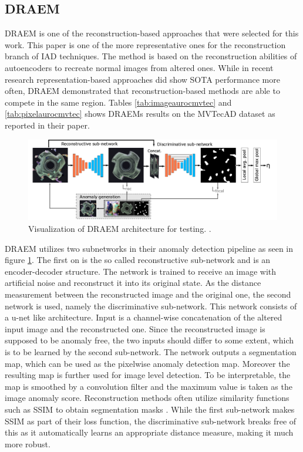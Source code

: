 \subsection{DRAEM}
\label{subsec:DRAEM}

DRAEM \cite{Zavrtanik_2021DRAEM} is one of the reconstruction-based approaches that were selected for this work. This paper is one of the more representative ones for the reconstruction branch of 
IAD techniques. The method is based on the reconstruction abilities of autoencoders to recreate normal images from altered ones. While in recent research representation-based approaches did 
show SOTA performance more often, DRAEM demonstrated that reconstruction-based methods are able to compete in the same region. Tables \ref{tab:imageaurocmvtec} and 
\ref{tab:pixelaurocmvtec} shows DRAEMs results on the MVTecAD dataset as reported 
in their paper.\newline

\begin{figure}[ht]
    \centering
    \includegraphics[width=\textwidth]{figures/DRAEM_pipeline.png}
    \caption{Visualization of DRAEM architecture for testing. \cite{Zavrtanik_2021DRAEM}.}
    \label{fig:draempipeline}
\end{figure}

DRAEM utilizes two subnetworks in their anomaly detection pipeline as seen in figure \ref{fig:draempipeline}. The first on is the so called reconstructive sub-network and is an encoder-decoder structure. The network is trained 
to receive an image with artificial noise and reconstruct it into its original state. As the distance measurement between the reconstructed image and the original one, the second network is used, 
namely the discriminative sub-network. This network consists of a u-net \cite{Ronneberger_2015UNET} like architecture. Input is a channel-wise concatenation of the altered input image and the reconstructed 
one. Since the reconstructed image is supposed to be anomaly free, the two inputs should differ to some extent, which is to be learned by the second sub-network. The network outputs a segmentation map, 
which can be used as the pixelwise anomaly detection map. Moreover the resulting map is further used for image level detection. To be interpretable, the map is smoothed by a convolution filter 
and the maximum value is taken as the image anomaly score. Reconstruction methods often utilize similarity functions such as SSIM \cite{Wang_2004SSIM} to obtain segmentation masks \cite{Zavrtanik_2021DRAEM} 
\cite{liu2024deep}. While the first 
sub-network makes SSIM as part of their loss function, the discriminative sub-network breaks free of this as it automatically learns an appropriate distance measure, making it much more robust.

